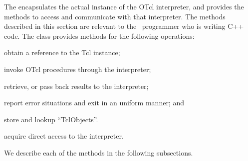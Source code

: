 \documentclass{article}
\begin{document}
The  encapsulates the actual instance of
the OTcl interpreter, and provides the methods
to access and communicate with that interpreter.
The methods described in this section are relevant to the
\ns\ programmer who is writing C++ code.
The class provides methods for the following operations:
\begin{list}{\textbullet}{}
\item obtain a reference to the Tcl instance;
\item invoke OTcl procedures through the interpreter;
\item retrieve, or pass back results to the interpreter;
\item report error situations and exit in an uniform manner; and
\item store and lookup ``TclObjects''.
\item acquire direct access to the interpreter.
\end{list}
We describe each of the methods in the following subsections.
\end{document}
